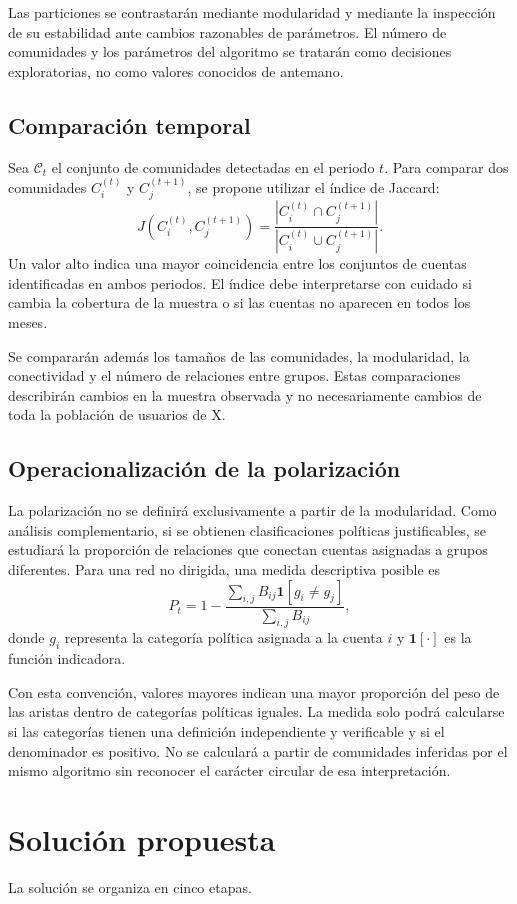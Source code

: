 \documentclass[journal]{IEEEtran}
\begin{document}
Las particiones se contrastarán mediante modularidad y mediante la inspección de su estabilidad ante cambios razonables de parámetros. El número de comunidades y los parámetros del algoritmo se tratarán como decisiones exploratorias, no como valores conocidos de antemano.

\subsection{Comparación temporal}
Sea $\mathcal C_t$ el conjunto de comunidades detectadas en el periodo $t$. Para comparar dos comunidades $C_i^{(t)}$ y $C_j^{(t+1)}$, se propone utilizar el índice de Jaccard:
\[
J(C_i^{(t)},C_j^{(t+1)})=
\frac{|C_i^{(t)}\cap C_j^{(t+1)}|}{|C_i^{(t)}\cup C_j^{(t+1)}|}.
\]
Un valor alto indica una mayor coincidencia entre los conjuntos de cuentas identificadas en ambos periodos. El índice debe interpretarse con cuidado si cambia la cobertura de la muestra o si las cuentas no aparecen en todos los meses.

Se compararán además los tamaños de las comunidades, la modularidad, la conectividad y el número de relaciones entre grupos. Estas comparaciones describirán cambios en la muestra observada y no necesariamente cambios de toda la población de usuarios de X.

\subsection{Operacionalización de la polarización}
La polarización no se definirá exclusivamente a partir de la modularidad. Como análisis complementario, si se obtienen clasificaciones políticas justificables, se estudiará la proporción de relaciones que conectan cuentas asignadas a grupos diferentes. Para una red no dirigida, una medida descriptiva posible es
\[
P_t=1-\frac{\sum_{i,j}B_{ij}\mathbf{1}[g_i\ne g_j]}{\sum_{i,j}B_{ij}},
\]
donde $g_i$ representa la categoría política asignada a la cuenta $i$ y $\mathbf 1[\cdot]$ es la función indicadora.

Con esta convención, valores mayores indican una mayor proporción del peso de las aristas dentro de categorías políticas iguales. La medida solo podrá calcularse si las categorías tienen una definición independiente y verificable y si el denominador es positivo. No se calculará a partir de comunidades inferidas por el mismo algoritmo sin reconocer el carácter circular de esa interpretación.

\section{Solución propuesta}
La solución se organiza en cinco etapas.
\end{document}

